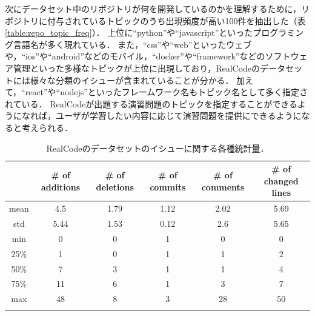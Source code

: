 次にデータセット中のリポジトリが何を開発しているのかを理解するために，リポジトリに付与されているトピックのうち出現頻度が高い100件を抽出した（表\ref{table:repo_topic_freq}）．
上位に``python''や``javascript''といったプログラミング言語名が多く現れている．
また，``css''や``web''といったウェブや，``ios''や``android''などのモバイル，``docker''や``framework''などのソフトウェア管理といった多様なトピックが上位に出現しており，RealCodeのデータセットには様々な分類のイシューが含まれていることが分かる．
加えて，``react''や``nodejs''といったフレームワーク名もトピック名として多く指定されている．
RealCodeが出題する演習問題のトピックを指定することができるようになれば，ユーザが学習したい内容に応じて演習問題を提供にできるようになると考えられる．

\begin{table}[!b]
 \small
  \centering
  \caption{RealCodeのデータセットのイシューに関する各種統計量．}
  \label{table:stats_issues}
  \begin{tabular}{c || c | c | c | c | c } \Xhline{3\arrayrulewidth}
        & \# of additions & \# of deletions & \# of commits & \# of comments & \# of changed lines \\ \hline \hline
        mean & 4.5 & 1.79 & 1.12 & 2.02 & 5.69 \\
        std & 5.44 & 1.53 & 0.12 & 2.6 & 5.65 \\
        min & 0 & 0 & 1 & 0 & 0 \\
        25\% & 1 & 0 & 1 & 1 & 2 \\
        50\% & 7 & 3 & 1 & 1 & 4 \\
        75\% & 11 & 6 & 1 & 3 & 7 \\
        max & 48 & 8 & 3 & 28 & 50 \\
    \Xhline{3\arrayrulewidth}
\end{tabular}
\end{table}

